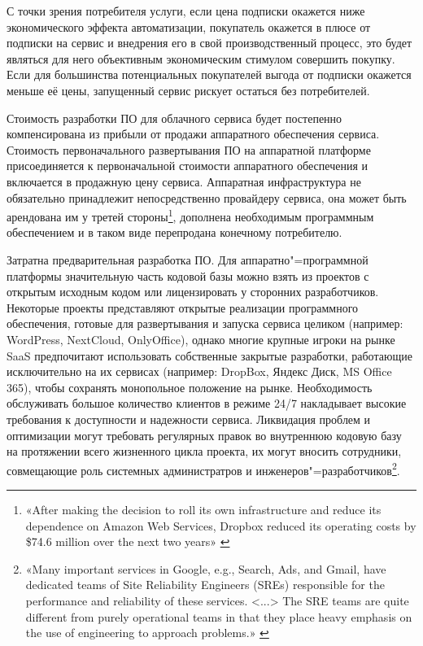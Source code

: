 \documentclass{article}
\begin{document}
С точки зрения потребителя услуги, если цена подписки окажется ниже экономического эффекта автоматизации, покупатель окажется в плюсе от подписки на сервис и внедрения его в свой производственный процесс, это будет являться для него объективным экономическим стимулом совершить покупку. Если для большинства потенциальных покупателей выгода от подписки окажется меньше её цены, запущенный сервис рискует остаться без потребителей.

Стоимость разработки ПО для облачного сервиса будет постепенно компенсирована из прибыли от продажи аппаратного обеспечения сервиса. Стоимость первоначального развертывания ПО на аппаратной платформе присоединяется к первоначальной стоимости аппаратного обеспечения и включается в продажную цену сервиса. Аппаратная инфраструктура не обязательно принадлежит непосредственно провайдеру сервиса, она может быть арендована им у третей стороны\footnote{«After making the decision to roll its own infrastructure and reduce its dependence on Amazon Web Services, Dropbox reduced its operating costs by \$74.6 million over the next two years» \cite{dropboxBuildsOwnInfra}}, дополнена необходимым программным обеспечением и в таком виде перепродана конечному потребителю.

Затратна предварительная разработка ПО. Для аппаратно"=программной платформы значительную часть кодовой базы можно взять из проектов с открытым исходным кодом или лицензировать у сторонних разработчиков. Некоторые проекты представляют открытые реализации программного обеспечения, готовые для развертывания и запуска сервиса целиком (например: WordPress, NextCloud, OnlyOffice), однако многие крупные игроки на рынке SaaS предпочитают использовать собственные закрытые разработки, работающие исключительно на их сервисах (например: DropBox, Яндекс Диск, MS Office 365), чтобы сохранять монопольное положение на рынке. Необходимость обслуживать большое количество клиентов в режиме 24/7 накладывает высокие требования к доступности и надежности сервиса. Ликвидация проблем и оптимизации могут требовать регулярных правок во внутреннюю кодовую базу на протяжении всего жизненного цикла проекта, их могут вносить сотрудники, совмещающие роль системных администратров и инженеров"=разработчиков\footnote{«Many important services in Google, e.g., Search, Ads, and Gmail, have dedicated teams of Site Reliability Engineers (SREs) responsible for the performance and reliability of these services. <...> The SRE teams are quite different from purely operational teams in that they place heavy emphasis on the use of engineering to approach problems.» \cite{googleSRE}}.
\end{document}
